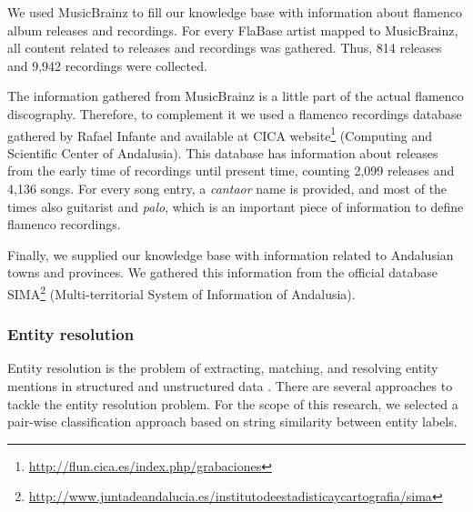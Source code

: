 We used MusicBrainz to fill our knowledge base with information about flamenco album releases and recordings. %
For every FlaBase artist mapped to MusicBrainz, all content related to releases and recordings was gathered. Thus, 814 releases and 9,942 recordings were collected. 

The information gathered from MusicBrainz is a little part of the actual flamenco discography. Therefore, to complement it we used a flamenco recordings database gathered by Rafael Infante and available at CICA website\footnote{\url{http://flun.cica.es/index.php/grabaciones}} (Computing and Scientific Center of Andalusia). This database has information about releases from the early time of recordings until present time, counting 2,099 releases and 4,136 songs. For every song entry, a \textit{cantaor} name is provided, and most of the times also guitarist and \textit{palo}, which is an important piece of information to define flamenco recordings.

Finally, we supplied our knowledge base with information related to Andalusian towns and provinces. We gathered this information from the official database SIMA\footnote{\url{http://www.juntadeandalucia.es/institutodeestadisticaycartografia/sima}} (Multi-territorial System of Information of Andalusia).%


\subsubsection{Entity resolution}
\label{sec:musicology:entity_resolution}

Entity resolution is the problem of extracting, matching, and resolving entity mentions in structured and unstructured data \citep{Getoor2012}. There are several approaches to tackle the entity resolution problem. For the scope of this research, we selected a pair-wise classification approach based on string similarity between entity labels.


